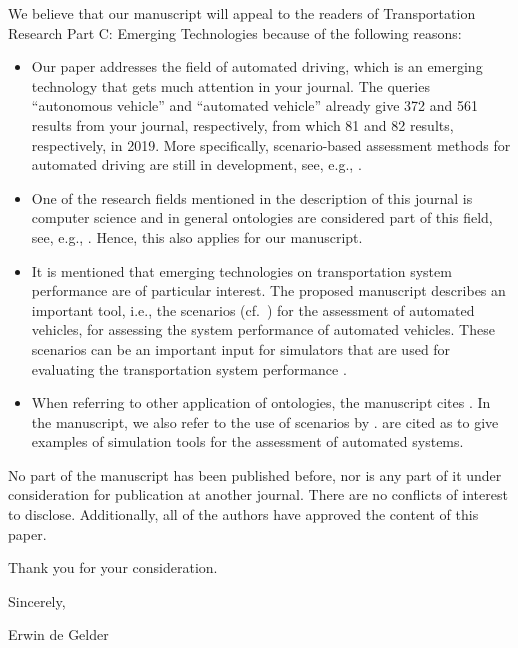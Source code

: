 \documentclass{article}
\renewcommand{\cite}[1]{\parencite{#1}}
\begin{document}
We believe that our manuscript will appeal to the readers of Transportation Research Part C: Emerging Technologies because of the following reasons:
\begin{itemize}
	\item Our paper addresses the field of automated driving, which is an emerging technology that gets much attention in your journal. The queries ``autonomous vehicle'' and ``automated vehicle'' already give 372 and 561 results from your journal, respectively, from which 81 and 82 results, respectively, in 2019. More specifically, scenario-based assessment methods for automated driving are still in development, see, e.g., \textcite{hou2019framework, shao2019evaluating, ge2018experimental, cui2018development, sepulcre2013cooperative}.
	\item One of the research fields mentioned in the description of this journal is computer science and in general ontologies are considered part of this field, see, e.g., \textcite{katsumi2018ontologies, benvenuti2017ontologybased, choi2015ontological, maiti2017conceptualization, ali2017fuzzy}. Hence, this also applies for our manuscript.
	\item It is mentioned that emerging technologies on transportation system performance are of particular interest. The proposed manuscript describes an important tool, i.e., the scenarios (cf.\ \textcite{xiong2015orchestration, bhatti2015design}) for the assessment of automated vehicles, for assessing the system performance of automated vehicles. These scenarios can be an important input for simulators that are used for evaluating the transportation system performance \cite{hou2019framework, cui2018development, ma2017twodimensional, mcconky2019dontpass}.
	\item When referring to other application of ontologies, the manuscript cites \textcite{maiti2017conceptualization, katsumi2018ontologies, benvenuti2017ontologybased}. In the manuscript, we also refer to the use of scenarios by \textcite{xiong2015orchestration, shao2019evaluating}. \textcite{hou2019framework, shao2019evaluating} are cited as to give examples of simulation tools for the assessment of automated systems.
\end{itemize}

No part of the manuscript has been published before, nor is any part of it under consideration for publication at another journal. There are no conflicts of interest to disclose. Additionally, all of the authors have approved the content of this paper.

\vspace{1em}

Thank you for your consideration.

\vspace{1em}

Sincerely,

Erwin de Gelder

\printbibliography
\end{document}
